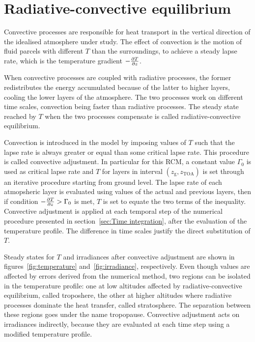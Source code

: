 \documentclass[a4paper,10pt,twocolumn,\classoptions]{article}
\newcommand{\zTOA}{z_\text{TOA}}
\begin{document}
\section{Radiative-convective equilibrium}
\label{sec:Radiative-convective equilibrium}
Convective processes are responsible for heat transport in the vertical direction of the idealised atmosphere under study. The effect of convection is the motion of fluid parcels with different $T$ than the surroundings, to achieve a steady lapse rate, which is the temperature gradient $-\pdv{T}{z}$.

When convective processes are coupled with radiative processes, the former redistributes the energy accumulated because of the latter to higher layers, cooling the lower layers of the atmosphere. The two processes work on different time scales, convection being faster than radiative processes. The steady state reached by $T$ when the two processes compensate is called radiative-convective equilibrium.

Convection is introduced in the model by imposing values of $T$ such that the lapse rate is always greater or equal than some critical lapse rate. This procedure is called convective adjustment.
In particular for this RCM, a constant value $\Gamma_0$ is used as critical lapse rate and $T$ for layers in interval $(z_\text{g}, \zTOA)$ is set through an iterative procedure starting from ground level. The lapse rate of each atmopsheric layer is evaluated using values of the actual and previous layers, then if condition $-\pdv{T}{z} > \Gamma_0$ is met, $T$ is set to equate the two terms of the inequality. Convective adjustment is applied at each temporal step of the numerical procedure presented in section~\ref{sec:Time integration}, after the evaluation of the temperature profile. The difference in time scales justify the direct substitution of $T$.

Steady states for $T$ and irradiances after convective adjustment are shown in figures~\ref{fig:temperature} and~\ref{fig:irradiance}, respectively. Even though values are affected by errors derived from the numerical method, two regions can be isolated in the temperature profile: one at low altitudes affected by radiative-convective equilibrium, called troposhere, the other at higher altitudes where radiative processes dominate the heat transfer, called stratosphere. The separation between these regions goes under the name tropopause. Convective adjustment acts on irradiances indirectly, because they are evaluated at each time step using a modified temperature profile.
\end{document}
